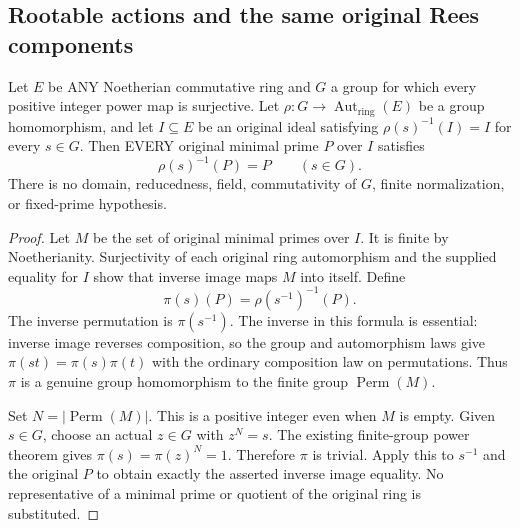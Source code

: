 \subsection{Rootable actions and the same original Rees components}

\begin{lemma}
\label{algebra:rootable-action-fixes-minimal-primes}
\leanok
Let $E$ be ANY Noetherian commutative ring and $G$ a group for which
every positive integer power map is surjective. Let
$\rho:G\to\operatorname{Aut}_{\mathrm{ring}}(E)$ be a group
homomorphism, and let $I\subseteq E$ be an original ideal satisfying
$\rho(s)^{-1}(I)=I$ for every $s\in G$.
Then EVERY original minimal prime $P$ over $I$ satisfies
\[
 \rho(s)^{-1}(P)=P\qquad(s\in G).
\]
There is no domain, reducedness, field, commutativity of $G$, finite
normalization, or fixed-prime hypothesis.
\end{lemma}
\begin{proof}
Let $M$ be the set of original minimal primes over $I$. It is finite
by Noetherianity. Surjectivity of each original ring automorphism and
the supplied equality for $I$ show that inverse image maps $M$ into
itself. Define
\[
 \pi(s)(P)=\rho(s^{-1})^{-1}(P).
\]
The inverse permutation is $\pi(s^{-1})$. The inverse in this formula
is essential: inverse image reverses composition, so the group and
automorphism laws give $\pi(st)=\pi(s)\pi(t)$ with the ordinary
composition law on permutations. Thus $\pi$ is a genuine group
homomorphism to the finite group $\operatorname{Perm}(M)$.

Set $N=|\operatorname{Perm}(M)|$. This is a positive integer even
when $M$ is empty. Given $s\in G$, choose an actual $z\in G$ with
$z^N=s$. The existing finite-group power theorem gives
$\pi(s)=\pi(z)^N=1$. Therefore $\pi$ is trivial. Apply this to
$s^{-1}$ and the original $P$ to obtain exactly the asserted inverse
image equality. No representative of a minimal prime or quotient of
the original ring is substituted.
\end{proof}

